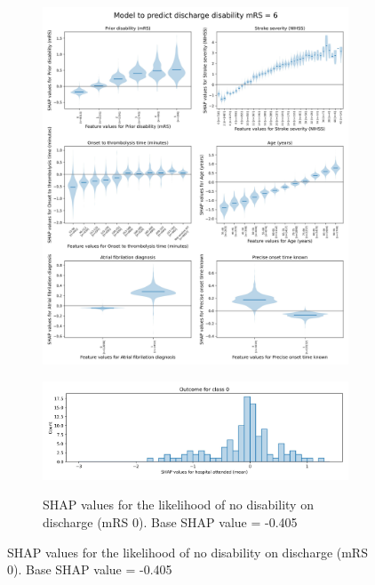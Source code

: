 \begin{figure}[ht]
\begin{subfigure}{.5\textwidth}
    \end{subfigure}%
    \begin{subfigure}{.5\textwidth}
      \centering
      \captionsetup{width=.9\linewidth}
      \includegraphics[trim={0 0 0 1.2cm}, clip, width=0.95\linewidth]      {./images/053_xgb_7_features_1fold_thrombolysis_shap_violin_all_features_for_mRS6}\\
    \end{subfigure}
    \hfill
    \begin{subfigure}{.5\textwidth}
      \centering
      \captionsetup{width=.9\linewidth}
      \includegraphics[trim={0 0 0 1cm}, clip, width=1\linewidth]    {./images/053_xgb_7_features_1fold_hosp_shap_hist_mrs0}\\
      \caption{\footnotesize{SHAP values for the likelihood of no disability on discharge (mRS 0). Base SHAP value = -0.405}}

\end{subfigure}
\end{figure}
